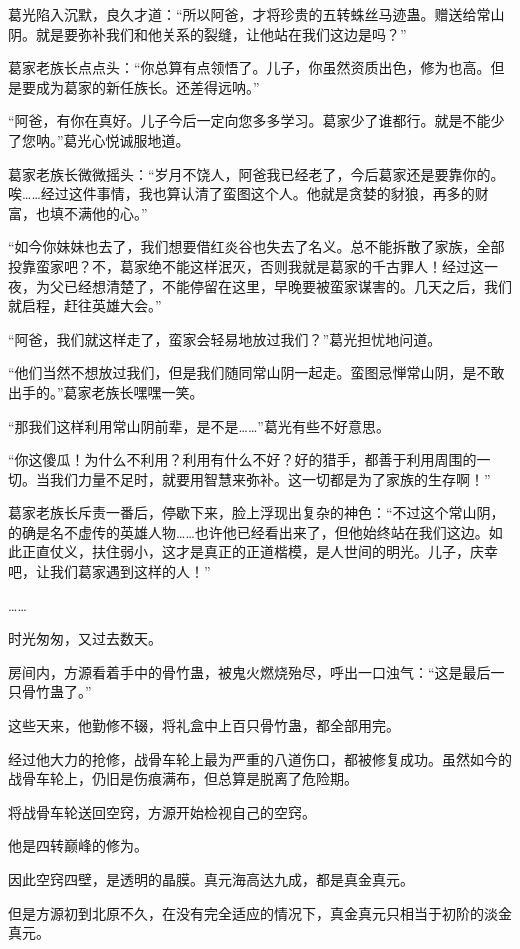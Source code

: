 \begin{this_body}
葛光陷入沉默，良久才道：“所以阿爸，才将珍贵的五转蛛丝马迹蛊。赠送给常山阴。就是要弥补我们和他关系的裂缝，让他站在我们这边是吗？”

葛家老族长点点头：“你总算有点领悟了。儿子，你虽然资质出色，修为也高。但是要成为葛家的新任族长。还差得远呐。”

“阿爸，有你在真好。儿子今后一定向您多多学习。葛家少了谁都行。就是不能少了您呐。”葛光心悦诚服地道。

葛家老族长微微摇头：“岁月不饶人，阿爸我已经老了，今后葛家还是要靠你的。唉……经过这件事情，我也算认清了蛮图这个人。他就是贪婪的豺狼，再多的财富，也填不满他的心。”

“如今你妹妹也去了，我们想要借红炎谷也失去了名义。总不能拆散了家族，全部投靠蛮家吧？不，葛家绝不能这样泯灭，否则我就是葛家的千古罪人！经过这一夜，为父已经想清楚了，不能停留在这里，早晚要被蛮家谋害的。几天之后，我们就启程，赶往英雄大会。”

“阿爸，我们就这样走了，蛮家会轻易地放过我们？”葛光担忧地问道。

“他们当然不想放过我们，但是我们随同常山阴一起走。蛮图忌惮常山阴，是不敢出手的。”葛家老族长嘿嘿一笑。

“那我们这样利用常山阴前辈，是不是……”葛光有些不好意思。

“你这傻瓜！为什么不利用？利用有什么不好？好的猎手，都善于利用周围的一切。当我们力量不足时，就要用智慧来弥补。这一切都是为了家族的生存啊！”

葛家老族长斥责一番后，停歇下来，脸上浮现出复杂的神色：“不过这个常山阴，的确是名不虚传的英雄人物……也许他已经看出来了，但他始终站在我们这边。如此正直仗义，扶住弱小，这才是真正的正道楷模，是人世间的明光。儿子，庆幸吧，让我们葛家遇到这样的人！”

……

时光匆匆，又过去数天。

房间内，方源看着手中的骨竹蛊，被鬼火燃烧殆尽，呼出一口浊气：“这是最后一只骨竹蛊了。”

这些天来，他勤修不辍，将礼盒中上百只骨竹蛊，都全部用完。

经过他大力的抢修，战骨车轮上最为严重的八道伤口，都被修复成功。虽然如今的战骨车轮上，仍旧是伤痕满布，但总算是脱离了危险期。

将战骨车轮送回空窍，方源开始检视自己的空窍。

他是四转巅峰的修为。

因此空窍四壁，是透明的晶膜。真元海高达九成，都是真金真元。

但是方源初到北原不久，在没有完全适应的情况下，真金真元只相当于初阶的淡金真元。


\end{this_body}
